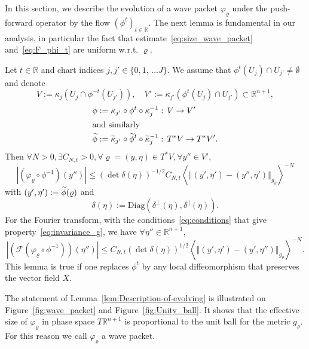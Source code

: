 \documentclass[AHL,Unicode,longabstracts,published]{cedram}
\newcommand{\clF}{\mathcal{F}}
\newcommand{\Diag}{\mathrm{Diag}}
\newcommand{\bbR}{\mathbb{R}}
\let\oldtilde\tilde
\renewcommand*{\tilde}[1]{\mathchoice{\widetilde{#1}}{\widetilde{#1}}{\oldtilde{#1}}{\oldtilde{#1}}}
\let\oldexists\exists
\renewcommand*{\exists}{\mathrel{\oldexists}}
\let\oldforall\forall
\renewcommand*{\forall}{\mathrel{\oldforall}}
\newcommand{\bbR}{\mathbb{R}}
\begin{document}
In this section, we describe the evolution of a wave packet $\varphi_{\varrho}$ under the push-forward operator by the flow $(\phi^{t})_{t\in\bbR}$. The next lemma is fundamental in our analysis, in particular the fact that estimate~\eqref{eq:size_wave_packet} and~\eqref{eq:F_phi_t} are uniform w.r.t. $\varrho$.
\begin{tcolorbox}[enhanced, frame style={teal!80}, interior style={cyan!0},breakable]
\begin{lemm}
\label{lem:Description-of-evolving}
Let $t\in\bbR$ and chart indices $j,j'\in\{ 0,1,\,\ldots J\} $. We assume that $\phi^{t}(U_{j})\cap U_{j'}\neq\emptyset$ and denote
\[
V:=\kappa_{j}\left(U_{j}\cap\phi^{-t}\left(U_{j'}\right)\right),\quad V':=\kappa_{j'}\left(\phi^{t}\left(U_{j}\right)\cap U_{j'}\right)\subset\bbR^{n+1},
\]
\begin{align*}
\phi:=\kappa_{j'}\circ\phi^{t}\circ\kappa_{j}^{-1} &:\,V\rightarrow V'
\\
\intertext{and similarly}
\tilde{\phi}:=\tilde{\kappa}_{j'}\circ\tilde{\phi}^{t}\circ\tilde{\kappa}_{j}^{-1} &: \,T^{*}V\rightarrow T^{*}V'.
\end{align*}
Then $\forall N>0,\exists C_{N,t}>0,\forall\varrho=(y,\eta)\in T^{*}V,\forall y''\in V',$
\begin{equation}\label{eq:size_wave_packet}
\left|\left(\varphi_{\varrho}\circ\phi^{-1}\right)\left(y''\right)\right|\leq\left(\det \delta\left(\eta\right)\right)^{-1/2}C_{N,t}\left\langle \left\Vert \left(y',\eta'\right)-\left(y'',\eta'\right)\right\Vert _{g_{\varrho}}\right\rangle ^{-N}
\end{equation}
with $(y',\eta'):=\tilde{\phi}(\varrho)$ and
\[
\delta\left(\eta\right):=\Diag\left(\delta^{\perp}\left(\eta\right),\delta^{\parallel}\left(\eta\right)\right).
\]
For the Fourier transform, with the conditions~\eqref{eq:conditions} that give property~\eqref{eq:invariance_g}, we have $\forall\eta''\in\bbR^{n+1}$,
\begin{equation}
\left|\left(\clF\left(\varphi_{\varrho}\circ\phi^{-1}\right)\right)\left(\eta''\right)\right|\leq C_{N,t}\left(\det \delta\left(\eta\right)\right)^{1/2}\left\langle \left\Vert \left(y',\eta'\right)-\left(y',\eta''\right)\right\Vert _{g_{\varrho}}\right\rangle ^{-N}.\label{eq:F_phi_t}
\end{equation}
This lemma is true if one replaces $\phi^{t}$ by any local diffeomorphism that preserves the vector field $X$.
\end{lemm}
\end{tcolorbox}
\begin{rema}
The statement of Lemma~\ref{lem:Description-of-evolving} is illustrated on Figure~\ref{fig:wave_packet} and Figure~\ref{fig:Unity_ball}. It shows that the effective size of $\varphi_{\varrho}$ in phase space $T\bbR^{n+1}$ is proportional to the unit ball for the metric $g_{\varrho}$. For this reason we call $\varphi_{\varrho}$ a wave packet.
\end{rema}
\end{document}
